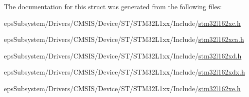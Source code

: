 The documentation for this struct was generated from the following files\-:\begin{DoxyCompactItemize}
\item 
eps\-Subsystem/\-Drivers/\-C\-M\-S\-I\-S/\-Device/\-S\-T/\-S\-T\-M32\-L1xx/\-Include/\hyperlink{stm32l162xc_8h}{stm32l162xc.\-h}\item 
eps\-Subsystem/\-Drivers/\-C\-M\-S\-I\-S/\-Device/\-S\-T/\-S\-T\-M32\-L1xx/\-Include/\hyperlink{stm32l162xca_8h}{stm32l162xca.\-h}\item 
eps\-Subsystem/\-Drivers/\-C\-M\-S\-I\-S/\-Device/\-S\-T/\-S\-T\-M32\-L1xx/\-Include/\hyperlink{stm32l162xd_8h}{stm32l162xd.\-h}\item 
eps\-Subsystem/\-Drivers/\-C\-M\-S\-I\-S/\-Device/\-S\-T/\-S\-T\-M32\-L1xx/\-Include/\hyperlink{stm32l162xdx_8h}{stm32l162xdx.\-h}\item 
eps\-Subsystem/\-Drivers/\-C\-M\-S\-I\-S/\-Device/\-S\-T/\-S\-T\-M32\-L1xx/\-Include/\hyperlink{stm32l162xe_8h}{stm32l162xe.\-h}\end{DoxyCompactItemize}
